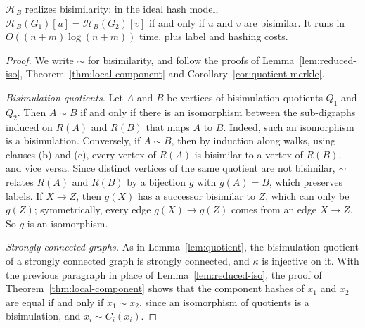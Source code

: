 \documentclass[twoside,leqno]{article}
\newcommand{\HB}{\mathcal{H}_{B}}
\newcommand{\Reach}{R}
\begin{document}
\begin{theorem}
\label{thm:bisimhash}
$\HB$ realizes bisimilarity: in the ideal hash model, $\HB(G_1)[u]=\HB(G_2)[v]$ if and only if $u$ and $v$ are bisimilar. It runs in $O((n+m)\log(n+m))$ time, plus label and hashing costs.
\end{theorem}
\begin{proof}
We write $\sim$ for bisimilarity, and follow the proofs of Lemma~\ref{lem:reduced-iso}, Theorem~\ref{thm:local-component} and Corollary~\ref{cor:quotient-merkle}.

\emph{Bisimulation quotients.} Let $A$ and $B$ be vertices of bisimulation quotients $Q_1$ and $Q_2$. Then $A\sim B$ if and only if there is an isomorphism between the sub-digraphs induced on $\Reach(A)$ and $\Reach(B)$ that maps $A$ to $B$. Indeed, such an isomorphism is a bisimulation. Conversely, if $A\sim B$, then by induction along walks, using clauses (b) and (c), every vertex of $\Reach(A)$ is bisimilar to a vertex of $\Reach(B)$, and vice versa. Since distinct vertices of the same quotient are not bisimilar, $\sim$ relates $\Reach(A)$ and $\Reach(B)$ by a bijection $g$ with $g(A)=B$, which preserves labels. If $X\to Z$, then $g(X)$ has a successor bisimilar to $Z$, which can only be $g(Z)$; symmetrically, every edge $g(X)\to g(Z)$ comes from an edge $X\to Z$. So $g$ is an isomorphism.

\emph{Strongly connected graphs.} As in Lemma~\ref{lem:quotient}, the bisimulation quotient of a strongly connected graph is strongly connected, and $\kappa$ is injective on it. With the previous paragraph in place of Lemma~\ref{lem:reduced-iso}, the proof of Theorem~\ref{thm:local-component} shows that the component hashes of $x_1$ and $x_2$ are equal if and only if $x_1\sim x_2$, since an isomorphism of quotients is a bisimulation, and $x_i\sim C_i(x_i)$.


\end{proof}
\end{document}
